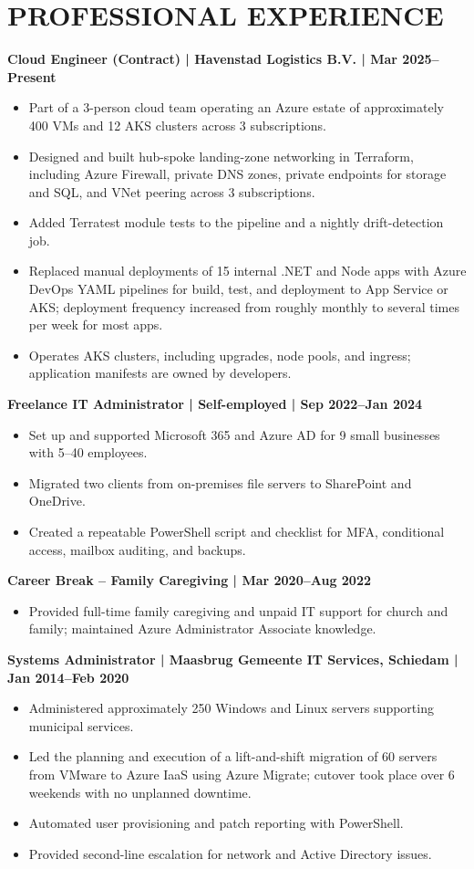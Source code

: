\documentclass[11pt,a4paper]{article}
\begin{document}
\section*{PROFESSIONAL EXPERIENCE}
\noindent\textbf{Cloud Engineer (Contract) | Havenstad Logistics B.V. | Mar 2025--Present}
\begin{itemize}
\item Part of a 3-person cloud team operating an Azure estate of approximately 400 VMs and 12 AKS clusters across 3 subscriptions.
\item Designed and built hub-spoke landing-zone networking in Terraform, including Azure Firewall, private DNS zones, private endpoints for storage and SQL, and VNet peering across 3 subscriptions.
\item Added Terratest module tests to the pipeline and a nightly drift-detection job.
\item Replaced manual deployments of 15 internal .NET and Node apps with Azure DevOps YAML pipelines for build, test, and deployment to App Service or AKS; deployment frequency increased from roughly monthly to several times per week for most apps.
\item Operates AKS clusters, including upgrades, node pools, and ingress; application manifests are owned by developers.
\end{itemize}

\noindent\textbf{Freelance IT Administrator | Self-employed | Sep 2022--Jan 2024}
\begin{itemize}
\item Set up and supported Microsoft 365 and Azure AD for 9 small businesses with 5--40 employees.
\item Migrated two clients from on-premises file servers to SharePoint and OneDrive.
\item Created a repeatable PowerShell script and checklist for MFA, conditional access, mailbox auditing, and backups.
\end{itemize}

\noindent\textbf{Career Break -- Family Caregiving | Mar 2020--Aug 2022}
\begin{itemize}
\item Provided full-time family caregiving and unpaid IT support for church and family; maintained Azure Administrator Associate knowledge.
\end{itemize}

\noindent\textbf{Systems Administrator | Maasbrug Gemeente IT Services, Schiedam | Jan 2014--Feb 2020}
\begin{itemize}
\item Administered approximately 250 Windows and Linux servers supporting municipal services.
\item Led the planning and execution of a lift-and-shift migration of 60 servers from VMware to Azure IaaS using Azure Migrate; cutover took place over 6 weekends with no unplanned downtime.
\item Automated user provisioning and patch reporting with PowerShell.
\item Provided second-line escalation for network and Active Directory issues.
\end{itemize}
\end{document}
